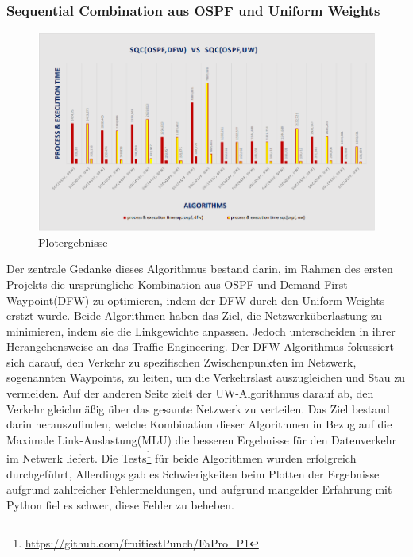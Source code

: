 \documentclass[sigconf, nonacm, review]{acmart}
\begin{document}
\subsubsection{Sequential Combination aus OSPF und Uniform Weights}
\begin{figure}
\centering
\includegraphics[width=\linewidth]{figures/naveed_p1.png}
\caption{Plotergebnisse}
\label{fig:naveed_p1}
\end{figure}
Der zentrale Gedanke dieses  Algorithmus bestand darin, 
im Rahmen des ersten Projekts die urspr\"ungliche Kombination aus OSPF und Demand First Waypoint(DFW)  zu optimieren, 
indem der DFW durch den Uniform Weights erstzt wurde. 
Beide Algorithmen haben das Ziel, die Netzwerk\"uberlastung zu minimieren, indem sie die Linkgewichte anpassen. 
Jedoch unterscheiden in ihrer Herangehensweise an das Traffic Engineering.\newline
Der DFW-Algorithmus fokussiert sich darauf, den Verkehr zu spezifischen Zwischenpunkten im Netzwerk, 
sogenannten Waypoints, zu leiten, um die Verkehrslast auszugleichen und Stau zu vermeiden. 
Auf der anderen Seite zielt der UW-Algorithmus darauf ab, den Verkehr gleichm\"a\ss ig \"uber das gesamte Netzwerk zu verteilen.\newline
Das Ziel bestand darin herauszufinden, 
welche Kombination dieser Algorithmen in Bezug auf die Maximale Link-Auslastung(MLU) die besseren Ergebnisse f\"ur den Datenverkehr im Netwerk liefert.\newline
Die Tests\footnote{\url{https://github.com/fruitiestPunch/FaPro\_P1}} f\"ur beide Algorithmen wurden erfolgreich durchgef\"uhrt, Allerdings gab es Schwierigkeiten beim Plotten der Ergebnisse aufgrund zahlreicher Fehlermeldungen, 
und aufgrund mangelder Erfahrung mit Python fiel es schwer, diese Fehler zu beheben.\newline
\end{document}
